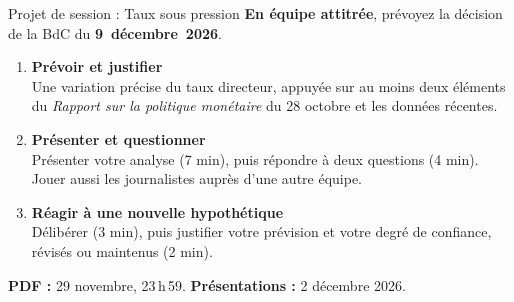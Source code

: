 \documentclass[aspectratio=169]{beamer}
\begin{document}
\begin{frame}[t]{Projet de session : Taux sous pression}
   \small
   \textbf{En équipe attitrée}, prévoyez la décision de la BdC du \textbf{\mbox{9 décembre 2026}}.
   \vspace{0.1cm}
   \begin{enumerate}
      \setlength\itemsep{0.1cm}
      \item \textbf{Prévoir et justifier} \\
      Une variation précise du taux directeur, appuyée sur au moins deux éléments du \textit{Rapport sur la politique monétaire} du 28 octobre et les données récentes.
      \item \textbf{Présenter et questionner} \\
      Présenter votre analyse (7 min), puis répondre à deux questions (4 min). Jouer aussi les journalistes auprès d'une autre équipe.
      \item \textbf{Réagir à une nouvelle hypothétique} \\
      Délibérer (3 min), puis justifier votre prévision et votre degré de confiance, révisés ou maintenus (2 min).
   \end{enumerate}
   \vspace{-0.2cm}
   \begin{keyinsight}[]
      \small \textbf{PDF :} 29 novembre, 23\,h\,59. \quad \textbf{Présentations :} 2 décembre 2026.
   \end{keyinsight}
\end{frame}
\end{document}
